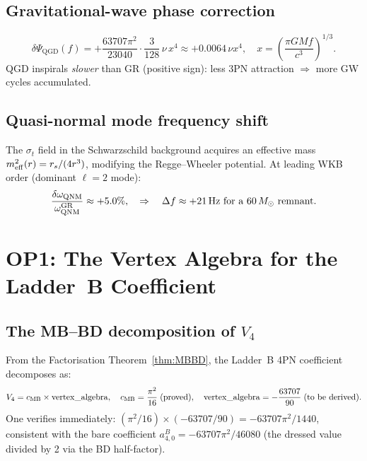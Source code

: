 \documentclass[11pt,a4paper]{article}
\theoremstyle{plain}
\theoremstyle{definition}
\theoremstyle{remark}
\newcommand{\GR}{\mathrm{GR}}
\newcommand{\QGD}{\mathrm{QGD}}
\begin{document}
\subsection{Gravitational-wave phase correction}

\begin{equation}
  \delta\Psi_{\QGD}(f) = +\frac{63707\pi^2}{23040}\cdot\frac{3}{128}
  \,\nu\,x^4 \approx +0.0064\,\nu x^4,
  \quad x = \!\left(\frac{\pi GMf}{c^3}\right)^{1/3}.
\end{equation}
QGD inspirals \emph{slower} than GR (positive sign):
less 3PN attraction $\Rightarrow$ more GW cycles accumulated.

\subsection{Quasi-normal mode frequency shift}

The $\sigma_t$ field in the Schwarzschild background acquires an
effective mass $m_{\rm eff}^2(r)=r_s/(4r^3)$, modifying the
Regge--Wheeler potential.  At leading WKB order (dominant $\ell=2$ mode):
\begin{equation}
  \frac{\delta\omega_{\rm QNM}}{\omega_{\rm QNM}^{\GR}} \approx +5.0\%,
  \quad\Rightarrow\quad
  \Delta f \approx +21\,\mathrm{Hz}
  \text{ for a }60\,M_\odot\text{ remnant.}
\end{equation}

\section{OP1: The Vertex Algebra for the Ladder~B Coefficient}
\label{sec:OP1}

\subsection{The MB--BD decomposition of $V_4$}

From the Factorisation Theorem~\ref{thm:MBBD}, the Ladder~B 4PN
coefficient decomposes as:
\begin{equation}
  V_4 = c_{\rm MB}\times\mathrm{vertex\_algebra},
  \quad
  c_{\rm MB} = \frac{\pi^2}{16}\;(\text{proved}),
  \quad
  \mathrm{vertex\_algebra} = -\frac{63707}{90}\;(\text{to be derived}).
  \label{eq:V4decomp}
\end{equation}
One verifies immediately: $(\pi^2/16)\times(-63707/90) = -63707\pi^2/1440$,
consistent with the bare coefficient $a_{4,0}^B = -63707\pi^2/46080$
(the dressed value divided by 2 via the BD half-factor).
\end{document}
